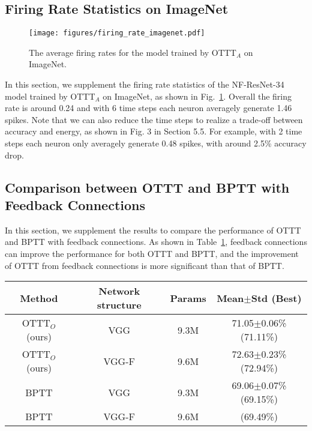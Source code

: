 \documentclass{article}
\begin{document}
\subsection{Firing Rate Statistics on ImageNet}

\begin{figure}[h]
	\centering
	\texttt{[image: figures/firing\_rate\_imagenet.pdf]}
	\caption{The average firing rates for the model trained by OTTT$_A$ on ImageNet.}
	\label{firing rate imagenet}
\end{figure}

In this section, we supplement the firing rate statistics of the NF-ResNet-34 model trained by OTTT$_A$ on ImageNet, as shown in Fig.~\ref{firing rate imagenet}. Overall the firing rate is around 0.24 and with 6 time steps each neuron averagely generate 1.46 spikes. Note that we can also reduce the time steps to realize a trade-off between accuracy and energy, as shown in Fig. 3 in Section 5.5. For example, with 2 time steps each neuron only averagely generate 0.48 spikes, with around 2.5\% accuracy drop.

\subsection{Comparison between OTTT and BPTT with Feedback Connections}

In this section, we supplement the results to compare the performance of OTTT and BPTT with feedback connections. As shown in Table~\ref{feedback ottt and bptt}, feedback connections can improve the performance for both OTTT and BPTT, and the improvement of OTTT from feedback connections is more significant than that of BPTT.

\begin{table} [ht]
	\centering
	\small
	\tabcolsep=2mm
	\begin{tabular}{cccc}
		\toprule[1pt]
		Method & Network structure & Params & Mean$\pm$Std (Best)\\
		\midrule[0.5pt]
		OTTT$_O$ (ours) & VGG & 9.3M & 71.05$\pm$0.06\% (71.11\%)\\
		OTTT$_O$ (ours) & VGG-F & 9.6M & 72.63$\pm$0.23\% (72.94\%)\\
		\hline
		BPTT & VGG & 9.3M & 69.06$\pm$0.07\% (69.15\%)\\
		BPTT & VGG-F & 9.6M & (69.49\%)\\
		\bottomrule[1pt]
	\end{tabular}
	\label{feedback ottt and bptt}
\end{table}
\end{document}
